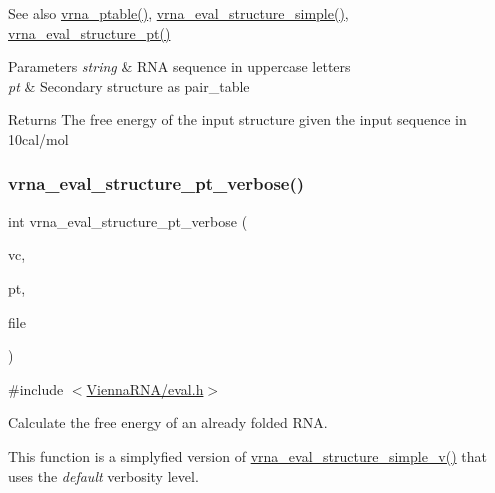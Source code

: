 \begin{DoxySeeAlso}{See also}
\hyperlink{group__struct__utils_gae829fb8bb7f694c12a9c0bbc34c77c60}{vrna\+\_\+ptable()}, \hyperlink{group__eval_gab6930f446d04761454d033680fbf7909}{vrna\+\_\+eval\+\_\+structure\+\_\+simple()}, \hyperlink{group__eval_gadbd09372ddfd7a450bbd590c96a6bfe4}{vrna\+\_\+eval\+\_\+structure\+\_\+pt()}
\end{DoxySeeAlso}

\begin{DoxyParams}{Parameters}
{\em string} & R\+NA sequence in uppercase letters \\
\hline
{\em pt} & Secondary structure as pair\+\_\+table \\
\hline
\end{DoxyParams}
\begin{DoxyReturn}{Returns}
The free energy of the input structure given the input sequence in 10cal/mol 
\end{DoxyReturn}
\mbox{\label{group__eval_ga8a517cfeeae8c376ae7b1e0c401d38b4}} 
\subsubsection{\texorpdfstring{vrna\+\_\+eval\+\_\+structure\+\_\+pt\+\_\+verbose()}{vrna\_eval\_structure\_pt\_verbose()}}
{\footnotesize\ttfamily int vrna\+\_\+eval\+\_\+structure\+\_\+pt\+\_\+verbose (\begin{DoxyParamCaption}\item[{\hyperlink{group__fold__compound_ga1b0cef17fd40466cef5968eaeeff6166}{vrna\+\_\+fold\+\_\+compound\+\_\+t} $\ast$}]{vc,  }\item[{const short $\ast$}]{pt,  }\item[{F\+I\+LE $\ast$}]{file }\end{DoxyParamCaption})}



{\ttfamily \#include $<$\hyperlink{eval_8h}{Vienna\+R\+N\+A/eval.\+h}$>$}



Calculate the free energy of an already folded R\+NA. 

This function is a simplyfied version of \hyperlink{group__eval_gaddb30ac265f1a39557170e7acac4930f}{vrna\+\_\+eval\+\_\+structure\+\_\+simple\+\_\+v()} that uses the {\itshape default} verbosity level.

